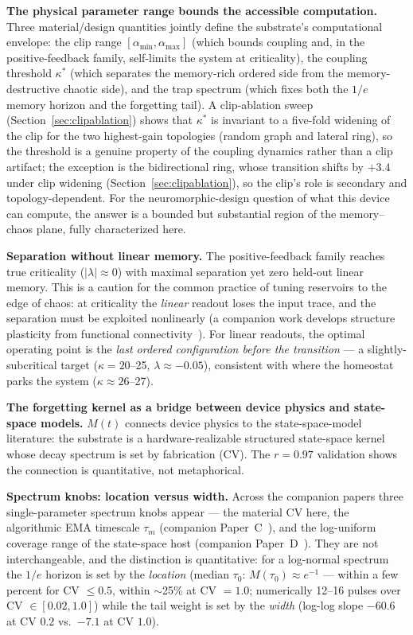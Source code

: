 \documentclass[11pt]{article}
\begin{document}
\textbf{The physical parameter range bounds the accessible computation.} Three
material/design quantities jointly define the substrate's computational
envelope: the clip range $[\alpha_{\min},\alpha_{\max}]$ (which bounds coupling
and, in the positive-feedback family, self-limits the system at criticality),
the coupling threshold $\kappa^\ast$ (which separates the memory-rich ordered
side from the memory-destructive chaotic side), and the trap spectrum (which
fixes both the $1/e$ memory horizon and the forgetting tail). A clip-ablation
sweep (Section~\ref{sec:clipablation}) shows that $\kappa^\ast$ is invariant
to a five-fold widening of the clip for the two highest-gain topologies
(random graph and lateral ring), so the
threshold is a genuine property of the coupling dynamics rather than a clip
artifact; the exception is the bidirectional ring, whose transition shifts by
$+3.4$ under clip widening (Section~\ref{sec:clipablation}), so the clip's
role is secondary and topology-dependent. For the
neuromorphic-design question of what this device can compute, the answer
is a bounded but substantial region of the memory--chaos plane, fully
characterized here.

\textbf{Separation without linear memory.} The positive-feedback family reaches
true criticality ($|\lambda|\approx0$) with maximal separation yet zero held-out
linear memory. This is a caution for the common practice of tuning reservoirs to
the edge of chaos: at criticality the \emph{linear} readout loses the input
trace, and the separation must be exploited nonlinearly (a companion work
develops structure plasticity from functional connectivity~\cite{companionB}). For linear readouts, the
optimal operating point is the \emph{last ordered configuration before the
transition} --- a slightly-subcritical target ($\kappa = 20$--25,
$\lambda \approx -0.05$), consistent with where the homeostat parks the
system ($\kappa \approx 26$--27).

\textbf{The forgetting kernel as a bridge between device physics and
state-space models.} $M(t)$ connects device
physics to the state-space-model literature: the substrate is a
hardware-realizable structured state-space kernel whose decay spectrum is set
by fabrication (CV). The $r=0.97$ validation shows the connection is
quantitative, not metaphorical.

\textbf{Spectrum knobs: location versus width.} Across the companion
papers three single-parameter spectrum knobs appear --- the material
CV here, the algorithmic EMA timescale $\tau_m$ (companion Paper~C~\cite{companionC}), and the
log-uniform coverage range of the state-space host (companion Paper~D~\cite{companionD}). They
are not interchangeable, and the distinction is quantitative: for a
log-normal spectrum the $1/e$ horizon is set by the \emph{location}
(median $\tau_0$: $M(\tau_0)\approx e^{-1}$ --- within a few percent for
CV $\le 0.5$, within $\sim$25\% at CV $=1.0$; numerically
12--16 pulses over CV $\in[0.02,1.0]$) while the tail weight is set by
the \emph{width} (log-log slope $-60.6$ at CV $0.2$ vs.\ $-7.1$
at CV $1.0$).
\end{document}
